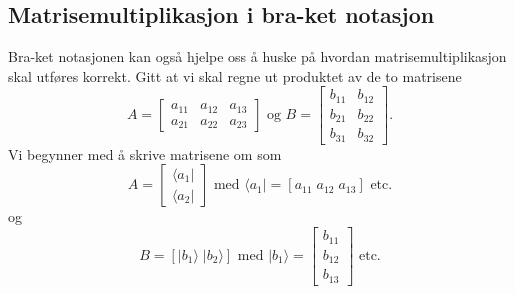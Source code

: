 \subsection{Matrisemultiplikasjon i bra-ket notasjon}
Bra-ket notasjonen kan også hjelpe oss å huske på hvordan matrisemultiplikasjon skal utføres korrekt. Gitt at vi skal regne ut produktet av de to matrisene 
\begin{displaymath}
	A = \left[\begin{array}{ccc} a_{11} & a_{12} & a_{13} \\ a_{21} & a_{22} & a_{23} \end{array}\right] \text{ og }
	B = \left[\begin{array}{cc} b_{11} & b_{12} \\ b_{21} & b_{22} \\ b_{31} & b_{32}\end{array} \right]. 
\end{displaymath}
Vi begynner med å skrive matrisene om som
\begin{displaymath}
	A = \left[\begin{array}{c} \langle a_1| \\ \langle a_2|\end{array}\right] \text{ med } \langle a_1| = [a_{11} \; a_{12} \; a_{13}] \text{ etc.}
\end{displaymath}
og 
\begin{displaymath}
	B = \left[|b_1\rangle \; |b_2\rangle \right] \text{ med } |b_1\rangle = \left[\begin{array}{c} b_{11} \\ b_{12} \\ b_{13} \end{array}\right] \text{ etc.}
\end{displaymath}